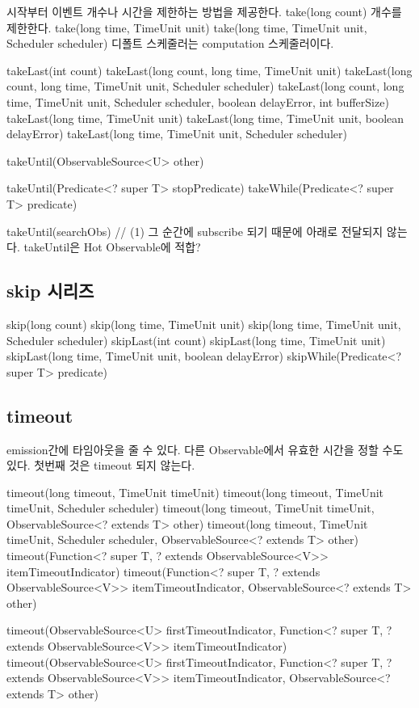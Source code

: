 \documentclass{book}
\begin{document}
{시작부터 이벤트 개수나 시간을 제한하는 방법을 제공한다.
take(long count)
개수를 제한한다.
take(long time, TimeUnit unit)
take(long time, TimeUnit unit, Scheduler scheduler)
디폴트 스케줄러는 computation 스케줄러이다.



takeLast(int count)
takeLast(long count, long time, TimeUnit unit)
takeLast(long count, long time, TimeUnit unit, Scheduler scheduler)
takeLast(long count, long time, TimeUnit unit, Scheduler scheduler, boolean delayError, int bufferSize)
takeLast(long time, TimeUnit unit)
takeLast(long time, TimeUnit unit, boolean delayError)
takeLast(long time, TimeUnit unit, Scheduler scheduler)

takeUntil(ObservableSource<U> other)

takeUntil(Predicate<? super T> stopPredicate)
takeWhile(Predicate<? super T> predicate)

takeUntil(searchObs) // (1) 그 순간에 subscribe 되기 때문에 아래로 전달되지 않는다. takeUntil은 Hot Observable에 적합?


\subsection{skip 시리즈}
skip(long count)
skip(long time, TimeUnit unit)
skip(long time, TimeUnit unit, Scheduler scheduler)
skipLast(int count)
skipLast(long time, TimeUnit unit)
skipLast(long time, TimeUnit unit, boolean delayError)
skipWhile(Predicate<? super T> predicate)

\subsection{timeout}
emission간에 타임아웃을 줄 수 있다.
다른 Observable에서 유효한 시간을 정할 수도 있다. 
첫번째 것은 timeout 되지 않는다.

timeout(long timeout, TimeUnit timeUnit)
timeout(long timeout, TimeUnit timeUnit, Scheduler scheduler)
timeout(long timeout, TimeUnit timeUnit, ObservableSource<? extends T> other)
timeout(long timeout, TimeUnit timeUnit, Scheduler scheduler, ObservableSource<? extends T> other)
timeout(Function<? super T, ? extends ObservableSource<V>> itemTimeoutIndicator)
timeout(Function<? super T, ? extends ObservableSource<V>> itemTimeoutIndicator,
            ObservableSource<? extends T> other)

timeout(ObservableSource<U> firstTimeoutIndicator,
            Function<? super T, ? extends ObservableSource<V>> itemTimeoutIndicator)
timeout(ObservableSource<U> firstTimeoutIndicator,
            Function<? super T, ? extends ObservableSource<V>> itemTimeoutIndicator,
                    ObservableSource<? extends T> other)                        

}
\end{document}

